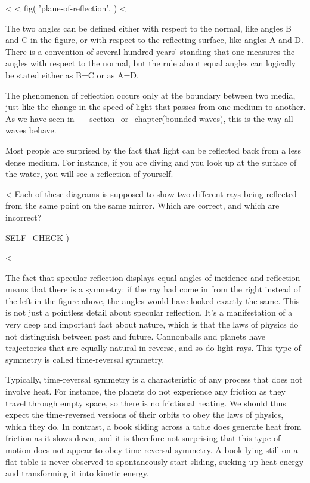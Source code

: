 <%
<%
  fig(
    'plane-of-reflection',
  )
<%

The two angles can be defined either with respect to the
normal, like angles B and C in the figure, or with
respect to the reflecting surface, like angles A and D.
There is a convention of several hundred years' standing
that one measures the angles with respect to the normal,
but the rule about equal angles can logically be stated
either as B=C or as A=D.

The phenomenon of reflection occurs only at the boundary
between two media, just like the change in the speed of
light that passes from one medium to another. As we have
seen in __section_or_chapter(bounded-waves), this is the way all waves behave.

Most people are surprised by the fact that light can be
reflected back from a less dense medium. For instance, if
you are diving and you look up at the surface of the water,
you will see a reflection of yourself.

\pagebreak[4]

<%
Each of these diagrams is supposed to show two different
rays being reflected from the same point on the same mirror.
Which are correct, and which are incorrect?


  SELF_CHECK
  ) %

<%

The fact that specular reflection displays equal angles of
incidence and reflection means that there is a symmetry: if
the ray had come in from the right instead of the left in
the figure above, the angles would have looked exactly the
same. This is not just a pointless detail about specular
reflection. It's a manifestation of a very deep and
important fact about nature, which is that the laws of
physics do not distinguish between past and future.
Cannonballs and planets have trajectories that are equally
natural in reverse, and so do light rays. This type of
symmetry is called time-reversal symmetry.

Typically, time-reversal symmetry is a characteristic of any
process that does not involve heat. For instance, the
planets do not experience any friction as they travel
through empty space, so there is no frictional heating. We
should thus expect the time-reversed versions of their
orbits to obey the laws of physics, which they do. In
contrast, a book sliding across a table does generate heat
from friction as it slows down, and it is therefore not
surprising that this type of motion does not appear to obey
time-reversal symmetry. A book lying still on a flat table
is never observed to spontaneously start sliding, sucking up
heat energy and transforming it into kinetic energy.

